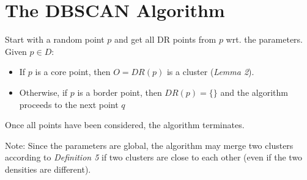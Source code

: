 \section{The DBSCAN Algorithm}
Start with a random point $p$ and get all DR points from $p$ wrt. the parameters.
Given $p \in D$: 
\begin{itemize}
\item If $p$ is a core point, then $O = DR(p)$ is a cluster (\textit{Lemma 2}).
\item Otherwise, if $p$ is a border point, then $DR(p) = \{\}$ and the algorithm proceeds to the next point $q$
\end{itemize}
Once all points have been considered, the algorithm terminates. 

Note: Since the parameters are global, the algorithm may merge two clusters according to \textit{Definition 5} if two clusters are close to each other (even if the two densities are different).
